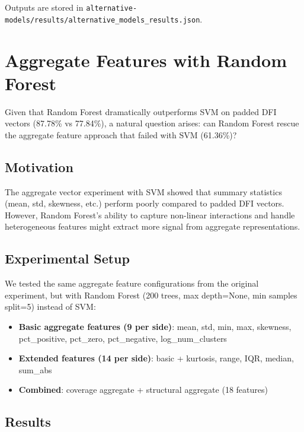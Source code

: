 \documentclass[12pt,a4paper]{article}
\begin{document}
Outputs are stored in \texttt{alternative-models/results/alternative\_models\_results.json}.

\section{Aggregate Features with Random Forest}

Given that Random Forest dramatically outperforms SVM on padded DFI vectors (87.78\% vs 77.84\%),
a natural question arises: can Random Forest rescue the aggregate feature approach that failed
with SVM (61.36\%)?

\subsection{Motivation}

The aggregate vector experiment with SVM showed that summary statistics (mean, std, skewness, etc.)
perform poorly compared to padded DFI vectors. However, Random Forest's ability to capture
non-linear interactions and handle heterogeneous features might extract more signal from
aggregate representations.

\subsection{Experimental Setup}

We tested the same aggregate feature configurations from the original experiment, but with
Random Forest (200 trees, max depth=None, min samples split=5) instead of SVM:

\begin{itemize}
\item \textbf{Basic aggregate features (9 per side)}: mean, std, min, max, skewness,
      pct\_positive, pct\_zero, pct\_negative, log\_num\_clusters
\item \textbf{Extended features (14 per side)}: basic + kurtosis, range, IQR, median, sum\_abs
\item \textbf{Combined}: coverage aggregate + structural aggregate (18 features)
\end{itemize}

\subsection{Results}
\end{document}
